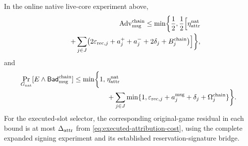 \begin{theorem}
\label{thm:native-online-message}
In the online native live-core experiment above,
\begin{equation}
\begin{split}
 \operatorname{Adv}_{\rm msg}^{\rm chain}
 \le\min\biggl\{\frac12,\frac12\Bigl[
    \eta_{\rm attr}^{\rm nat}\\[-2pt]
 \qquad+
 \sum_{j\in J}\bigl(2\varepsilon_{{\rm rec},j}
       +a_j^++a_j^-+2\delta_j+B_j^{\rm chain}\bigr)
                       \Bigr]\biggr\},
\end{split}
\label{eq:native-online-confidentiality}
\end{equation}
and
\begin{equation}
\begin{split}
 \Pr_{G_{\rm nat}}[E\wedge\mathsf{Bad}_{\rm msg}^{\rm chain}]
 \le\min\biggl\{1,\;&\eta_{\rm attr}^{\rm nat}\\[-2pt]
 &+\sum_{j\in J}\min\{1,\varepsilon_{{\rm rec},j}
       +a_j^{\rm msg}+\delta_j+\Omega_j^{\rm chain}\}\biggr\}.
\end{split}
\label{eq:native-online-integrity}
\end{equation}
For the executed-slot selector, the corresponding original-game
residual in each bound is at most $\Delta_{\rm attr}$ from
\eqref{eq:executed-attribution-cost}, using the complete expanded
signing experiment and its established reservation-signature bridge.
\end{theorem}
